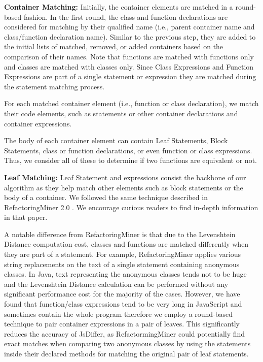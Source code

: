 \documentclass[letterpaper,12pt,onecolumn,final]{report}
\begin{document}
\textbf{Container Matching:} Initially, the container elements are matched in a round-based fashion. In the first round, the class and function declarations are considered for matching by their qualified name (i.e., parent container name and class/function declaration name). Similar to the previous step, they are added to the initial lists of matched, removed, or added containers based on the comparison of their names. Note that functions are matched with functions only and classes are matched with classes only. Since Class Expressions and Function Expressions are part of a single statement or expression they are matched during the statement matching process.

For each matched container element (i.e., function or class declaration), we match their code elements, such as statements or other container declarations and container expressions.

The body of each container element can contain Leaf Statements, Block Statements, class or function declarations, or even function or class expressions. Thus, we consider all of these to determine if two functions are equivalent or not.

\textbf{Leaf Matching:} Leaf Statement and expressions consist the backbone of our algorithm as they help match other elements such as block statements or the body of a container. We followed the same technique described in RefactoringMiner 2.0 \cite{Tsantalis2020}. We encourage curious readers to find in-depth information in that paper.

A notable difference from RefactoringMiner is that due to the Levenshtein Distance computation cost, classes and functions are matched differently when they are part of a statement. For example, RefactoringMiner applies various string replacements on the text of a single statement containing anonymous classes. In Java, text representing the anonymous classes tends not to be huge and the Levenshtein Distance calculation can be performed without any significant performance cost for the majority of the cases. However, we have found that function/class expressions tend to be very long in JavaScript and sometimes contain the whole program therefore we employ a round-based technique to pair container expressions in a pair of leaves. This significantly reduces the accuracy of JsDiffer, as RefactormingMiner could potentially find exact matches when comparing two anonymous classes by using the statements inside their declared methods for matching the original pair of leaf statements.
\end{document}
